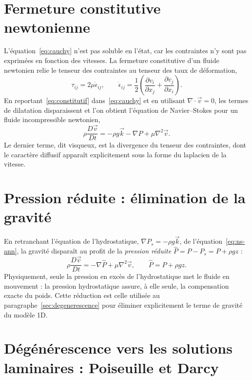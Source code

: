 \documentclass[11pt,a4paper]{report}
\newcommand{\Chat}{\hat{P}}
\newcommand{\divg}{\nabla\!\cdot\!}
\begin{document}
\section{Fermeture constitutive newtonienne}

L'équation~\eqref{eq:cauchy} n'est pas soluble en l'état, car les contraintes n'y sont pas exprimées en
fonction des vitesses. La fermeture constitutive d'un fluide newtonien relie le tenseur des contraintes au
tenseur des taux de déformation,
\begin{equation}
\tau_{ij} = 2\mu\dot{\epsilon}_{ij},
\qquad
\dot{\epsilon}_{ij} = \frac{1}{2}\left(\frac{\partial v_i}{\partial x_j}
+ \frac{\partial v_j}{\partial x_i}\right).
\label{eq:constitutif}
\end{equation}
En reportant~\eqref{eq:constitutif} dans~\eqref{eq:cauchy} et en utilisant
\(\divg\vec{v} = 0\), les termes de dilatation disparaissent et l'on obtient l'équation de
Navier--Stokes pour un fluide incompressible newtonien,
\begin{equation}
\rho\frac{D\vec{v}}{Dt} = -\rho g\vec{k} - \nabla P + \mu\nabla^2\vec{v}.
\label{eq:ns-ann}
\end{equation}
Le dernier terme, dit visqueux, est la divergence du tenseur des contraintes, dont le caractère
diffusif apparaît explicitement sous la forme du laplacien de la vitesse.

\section{Pression réduite : élimination de la gravité}

En retranchant l'équation de l'hydrostatique, \(\nabla P_s = -\rho g\vec{k}\), de
l'équation~\eqref{eq:ns-ann}, la gravité disparaît au profit de la \emph{pression réduite}
\(\Chat = P - P_s = P + \rho g z\) :
\begin{equation}
\rho\frac{D\vec{v}}{Dt} = -\nabla\Chat + \mu\nabla^2\vec{v},
\qquad
\Chat = P + \rho g z .
\label{eq:ns-reduite}
\end{equation}
Physiquement, seule la pression en excès de l'hydrostatique met le fluide en mouvement : la pression
hydrostatique assure, à elle seule, la compensation exacte du poids. Cette réduction est celle utilisée au
paragraphe~\ref{sec:degenerescence} pour éliminer explicitement le terme de gravité du modèle 1D.

\section{Dégénérescence vers les solutions laminaires : Poiseuille et Darcy}
\end{document}
